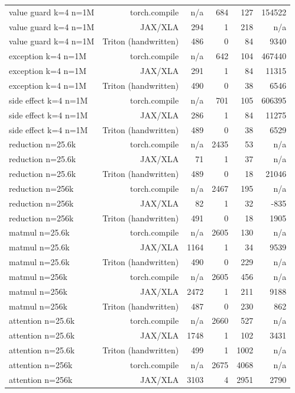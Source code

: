 \begin{tabular}{lrrrrr}
value guard k=4 n=1M & torch.compile & n/a & 684 & 127 & 154522 \\
value guard k=4 n=1M & JAX/XLA & 294 & 1 & 218 & n/a \\
value guard k=4 n=1M & Triton (handwritten) & 486 & 0 & 84 & 9340 \\
exception k=4 n=1M & torch.compile & n/a & 642 & 104 & 467440 \\
exception k=4 n=1M & JAX/XLA & 291 & 1 & 84 & 11315 \\
exception k=4 n=1M & Triton (handwritten) & 490 & 0 & 38 & 6546 \\
side effect k=4 n=1M & torch.compile & n/a & 701 & 105 & 606395 \\
side effect k=4 n=1M & JAX/XLA & 286 & 1 & 84 & 11275 \\
side effect k=4 n=1M & Triton (handwritten) & 489 & 0 & 38 & 6529 \\
reduction n=25.6k & torch.compile & n/a & 2435 & 53 & n/a \\
reduction n=25.6k & JAX/XLA & 71 & 1 & 37 & n/a \\
reduction n=25.6k & Triton (handwritten) & 489 & 0 & 18 & 21046 \\
reduction n=256k & torch.compile & n/a & 2467 & 195 & n/a \\
reduction n=256k & JAX/XLA & 82 & 1 & 32 & -835 \\
reduction n=256k & Triton (handwritten) & 491 & 0 & 18 & 1905 \\
matmul n=25.6k & torch.compile & n/a & 2605 & 130 & n/a \\
matmul n=25.6k & JAX/XLA & 1164 & 1 & 34 & 9539 \\
matmul n=25.6k & Triton (handwritten) & 490 & 0 & 229 & n/a \\
matmul n=256k & torch.compile & n/a & 2605 & 456 & n/a \\
matmul n=256k & JAX/XLA & 2472 & 1 & 211 & 9188 \\
matmul n=256k & Triton (handwritten) & 487 & 0 & 230 & 862 \\
attention n=25.6k & torch.compile & n/a & 2660 & 527 & n/a \\
attention n=25.6k & JAX/XLA & 1748 & 1 & 102 & 3431 \\
attention n=25.6k & Triton (handwritten) & 499 & 1 & 1002 & n/a \\
attention n=256k & torch.compile & n/a & 2675 & 4068 & n/a \\
attention n=256k & JAX/XLA & 3103 & 4 & 2951 & 2790 \\

\end{tabular}
